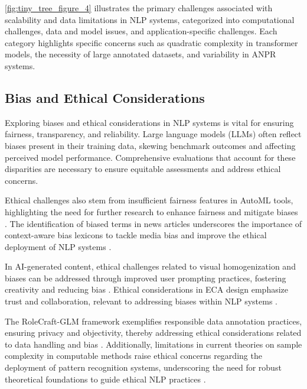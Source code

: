 \autoref{fig:tiny_tree_figure_4} illustrates the primary challenges associated with scalability and data limitations in NLP systems, categorized into computational challenges, data and model issues, and application-specific challenges. Each category highlights specific concerns such as quadratic complexity in transformer models, the necessity of large annotated datasets, and variability in ANPR systems.


\subsection{Bias and Ethical Considerations} \label{subsec:Bias and Ethical Considerations}

Exploring biases and ethical considerations in NLP systems is vital for ensuring fairness, transparency, and reliability. Large language models (LLMs) often reflect biases present in their training data, skewing benchmark outcomes and affecting perceived model performance. Comprehensive evaluations that account for these disparities are necessary to ensure equitable assessments and address ethical concerns.

Ethical challenges also stem from insufficient fairness features in AutoML tools, highlighting the need for further research to enhance fairness and mitigate biases \cite{narayanan2023democratizecareneedfairness}. The identification of biased terms in news articles underscores the importance of context-aware bias lexicons to tackle media bias and improve the ethical deployment of NLP systems \cite{spinde2021identificationbiasedtermsnews}.

In AI-generated content, ethical challenges related to visual homogenization and biases can be addressed through improved user prompting practices, fostering creativity and reducing bias \cite{palmini2024patternscreativityuserinput}. Ethical considerations in ECA design emphasize trust and collaboration, relevant to addressing biases within NLP systems \cite{korre2023takesvillagemultidisciplinaritycollaboration}.

The RoleCraft-GLM framework exemplifies responsible data annotation practices, ensuring privacy and objectivity, thereby addressing ethical considerations related to data handling and bias \cite{tao2024rolecraftglmadvancingpersonalizedroleplaying}. Additionally, limitations in current theories on sample complexity in computable methods raise ethical concerns regarding the deployment of pattern recognition systems, underscoring the need for robust theoretical foundations to guide ethical NLP practices \cite{ryabko2005samplecomplexitycomputationalpattern}.

